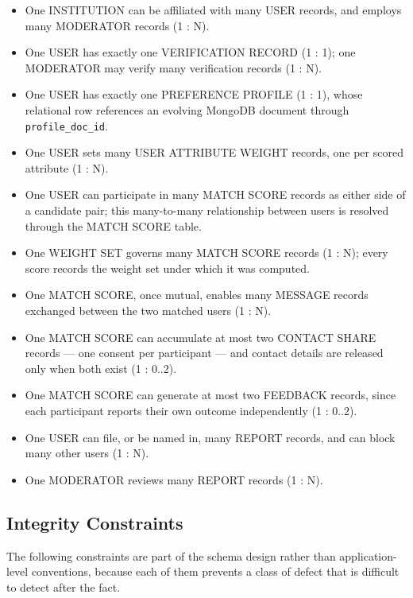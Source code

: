 \documentclass[12pt,a4paper]{report}
\begin{document}
\begin{itemize}[noitemsep]
    \item One INSTITUTION can be affiliated with many USER records, and employs many MODERATOR records (1 : N).
    \item One USER has exactly one VERIFICATION RECORD (1 : 1); one MODERATOR may verify many verification records (1 : N).
    \item One USER has exactly one PREFERENCE PROFILE (1 : 1), whose relational row references an evolving MongoDB document through \texttt{profile\_doc\_id}.
    \item One USER sets many USER ATTRIBUTE WEIGHT records, one per scored attribute (1 : N).
    \item One USER can participate in many MATCH SCORE records as either side of a candidate pair; this many-to-many relationship between users is resolved through the MATCH SCORE table.
    \item One WEIGHT SET governs many MATCH SCORE records (1 : N); every score records the weight set under which it was computed.
    \item One MATCH SCORE, once mutual, enables many MESSAGE records exchanged between the two matched users (1 : N).
    \item One MATCH SCORE can accumulate at most two CONTACT SHARE records --- one consent per participant --- and contact details are released only when both exist (1 : 0..2).
    \item One MATCH SCORE can generate at most two FEEDBACK records, since each participant reports their own outcome independently (1 : 0..2).
    \item One USER can file, or be named in, many REPORT records, and can block many other users (1 : N).
    \item One MODERATOR reviews many REPORT records (1 : N).
\end{itemize}

\subsection*{Integrity Constraints}

The following constraints are part of the schema design rather than application-level conventions, because each of them prevents a class of defect that is difficult to detect after the fact.
\end{document}
